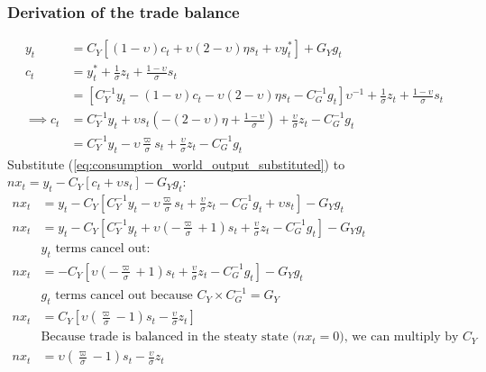 \subsubsection{Derivation of the trade balance}
\begin{align}\label{eq:appendix_trade_balance_derivation_beginning}
    y_t &= C_Y\left[(1-\upsilon)c_t + \upsilon (2-\upsilon)\eta s_t + \upsilon y^*_t\right] + G_Y g_t\\
    c_t &= y_t^* + \frac{1}{\sigma}z_t + \frac{1-\upsilon}{\sigma}s_t\\
    &= \left[C_Y^{-1} y_t -(1-\upsilon)c_t - \upsilon(2-\upsilon)\eta s_t - C^{-1}_G g_t \right]\upsilon^{-1} + \frac{1}{\sigma}z_t + \frac{1-\upsilon}{\sigma}s_t\\
    \implies c_t &= C_Y^{-1} y_t + \upsilon s_t \left( -(2-\upsilon)\eta + \frac{1-\upsilon}{\sigma}\right) + \frac{\upsilon}{\sigma}z_t - C_G^{-1} g_t \\
     &= C_Y^{-1} y_t - \upsilon \frac{\varpi}{\sigma} s_t + \frac{\upsilon}{\sigma}z_t - C_G^{-1} g_t \label{eq:consumption_world_output_substituted}
\end{align}
Substitute (\ref{eq:consumption_world_output_substituted}) to $nx_t=y_t - C_Y[c_t + \upsilon s_t] - G_Y g_t$:
\begin{align}
    nx_t&=y_t - C_Y\left[C_Y^{-1} y_t - \upsilon \frac{\varpi}{\sigma} s_t + \frac{\upsilon}{\sigma}z_t - C_G^{-1} g_t + \upsilon s_t \right] - G_Y g_t \\
    nx_t&=y_t - C_Y\left[C_Y^{-1} y_t + \upsilon \left(-\frac{\varpi}{\sigma} + 1\right) s_t + \frac{\upsilon}{\sigma}z_t - C_G^{-1} g_t \right] - G_Y g_t \\
    &\text{$y_t$ terms cancel out:} \nonumber\\
    nx_t&=-C_Y\left[\upsilon \left(-\frac{\varpi}{\sigma} + 1\right) s_t + \frac{\upsilon}{\sigma}z_t - C_G^{-1} g_t \right] - G_Y g_t \\
    &\text{$g_t$ terms cancel out because $C_Y\times C_G^{-1} = G_Y$} \nonumber\\
    nx_t&=C_Y\left[\upsilon \left(\frac{\varpi}{\sigma} - 1\right) s_t - \frac{\upsilon}{\sigma}z_t \right]\\
    &\text{Because trade is balanced in the steaty state ($nx_t = 0$), we can multiply by $C_Y$} \nonumber \\
    nx_t&=\upsilon \left(\frac{\varpi}{\sigma} - 1\right) s_t - \frac{\upsilon}{\sigma}z_t \label{eq:appendix_trade_balance_derivation_end}
\end{align}
\newpage